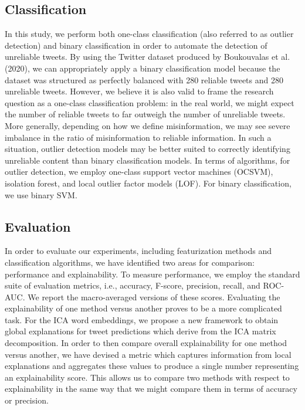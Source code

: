 \documentclass{article}
\begin{document}
\hypertarget{classification}{%
\subsection{Classification}\label{classification}}

In this study, we perform both one-class classification (also referred
to as outlier detection) and binary classification in order to automate
the detection of unreliable tweets. By using the Twitter dataset
produced by Boukouvalas et al. (2020), we can appropriately apply a
binary classification model because the dataset was structured as
perfectly balanced with 280 reliable tweets and 280 unreliable tweets.
However, we believe it is also valid to frame the research question as a
one-class classification problem: in the real world, we might expect the
number of reliable tweets to far outweigh the number of unreliable
tweets. More generally, depending on how we define misinformation, we
may see severe imbalance in the ratio of misinformation to reliable
information. In such a situation, outlier detection models may be better
suited to correctly identifying unreliable content than binary
classification models. In terms of algorithms, for outlier detection, we
employ one-class support vector machines (OCSVM), isolation forest, and
local outlier factor models (LOF). For binary classification, we use
binary SVM.

\hypertarget{evaluation}{%
\subsection{Evaluation}\label{evaluation}}

In order to evaluate our experiments, including featurization methods
and classification algorithms, we have identified two areas for
comparison: performance and explainability. To measure performance, we
employ the standard suite of evaluation metrics, i.e., accuracy,
F-score, precision, recall, and ROC-AUC. We report the macro-averaged
versions of these scores. Evaluating the explainability of one method
versus another proves to be a more complicated task. For the ICA word
embeddings, we propose a new framework to obtain global explanations for
tweet predictions which derive from the ICA matrix decomposition. In
order to then compare overall explainability for one method versus
another, we have devised a metric which captures information from local
explanations and aggregates these values to produce a single number
representing an explainability score. This allows us to compare two
methods with respect to explainability in the same way that we might
compare them in terms of accuracy or precision.
\end{document}
